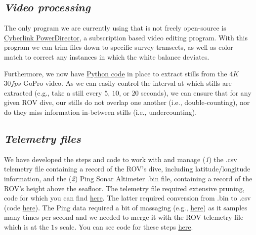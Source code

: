 \documentclass[11pt]{article}
\begin{document}
\subsection{\textit{Video processing}}
The only program we are currently using that is not freely open-source 
is 
\href{https://www.cyberlink.com/products/powerdirector-video-editing-software/features_en_US.html?r=1}{Cyberlink
 PowerDirector}, a subscription based video editing program.
With this program we can trim files down to specific survey transects, 
as well as color match to correct any instances in which the white 
balance deviates.

Furthermore, we now have 
\href{https://github.com/zhrandell/Seattle_Aquarium_ROV_telemetry_imagery_analysis/blob/main/code/4k_to_still.py}{Python
 code} in place to extract stills from the $4K$ $30fps$ GoPro video. 
As we can easily control the interval at which stills are extracted 
(e.g., take a still every $5$, $10$, or $20$ seconds), we can ensure 
that for any given ROV dive, our stills do not overlap one another 
(i.e., double-counting), nor do they miss information in-between stills 
(i.e., undercounting).   

\subsection{\textit{Telemetry files}}
We have developed the steps and code to work with and manage 
(\textit{1}) the .csv telemetry file containing a record of the ROV's 
dive, including latitude/longitude information, and the (\textit{2}) 
Ping Sonar Altimeter .bin file, containing a record of the ROV's height 
above the seafloor. 
The telemetry file required extensive pruning, code for which you can 
find 
\href{https://github.com/zhrandell/Seattle_Aquarium_ROV_telemetry_imagery_analysis/blob/main/code/tracklog_cleaning.R}{here}.
The latter required conversion from .bin to .csv (code 
\href{https://github.com/zhrandell/Seattle_Aquarium_ROV_telemetry_imagery_analysis/blob/main/code/Ping_to_csv.py}{here}).
The Ping data required a bit of massaging (e.g., 
\href{https://github.com/zhrandell/Seattle_Aquarium_ROV_telemetry_imagery_analysis/issues/3#issuecomment-1225997792}{here})
 as it samples many times per second and we needed to merge it with the 
 ROV telemetry file which is at the $1s$ scale.
You can see code for these steps 
\href{https://github.com/zhrandell/Seattle_Aquarium_ROV_telemetry_imagery_analysis/blob/main/code/ROV_telemetry_file_work.R}{here}.
\end{document}
